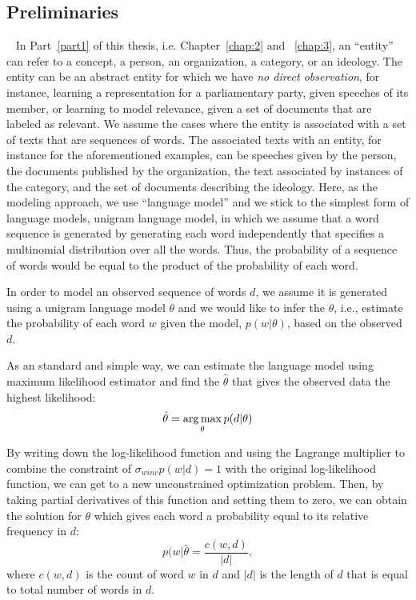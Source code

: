 \subsection{Preliminaries}
~\label{chap2_preliminaries}
In Part~\ref{part1} of this thesis, i.e. Chapter~\ref{chap:2} and ~\ref{chap:3}, an ``entity'' can refer to a concept, a person, an organization, a category, or an ideology. The entity can be an abstract entity for which we have \emph{no direct observation}, for instance, learning a representation for a parliamentary party, given speeches of its member, or learning to model relevance, given a set of documents that are labeled as relevant.
We assume the cases where the entity is associated with a set of texts that are sequences of words. The associated texts with an entity, for instance for the aforementioned examples, can be speeches given by the person, the documents published by the organization, the text associated by instances of the category, and the set of documents describing the ideology.
%
%
Here, as the modeling approach, we use ``language model'' and we stick to the simplest form of language models, unigram language model, in which we assume that a word sequence is generated by generating each word independently that specifies a multinomial distribution over all the words. Thus, the probability of a sequence of words would be equal to the product of the probability of each word.  

In order to model an observed sequence of words $d$, we assume it is generated using a unigram language model $\theta$ and we would like to infer the $\theta$, i.e., estimate the probability of each word $w$ given the model, $p(w|\theta)$, based on the observed $d$. 

As an standard and simple way, we can estimate the language model using maximum likelihood estimator and find the $\hat{\theta}$ that gives the observed data the highest likelihood:
\begin{equation}
\hat{\theta} = \operatorname*{arg\,max}_\theta p(d|\theta)
\end{equation}

By writing down the log-likelihood function and using the Lagrange multiplier to combine the constraint of $\sigma_{w in v}p(w|d) =1$ with the original log-likelihood function, we can get to a new unconstrained optimization problem. Then, by taking partial derivatives of this function and setting them to zero, we can obtain the solution for $\theta$ which gives each word a probability equal to its relative frequency in $d$:
\begin{equation}
    p(w|\hat{\theta} = \frac{c(w, d)}{|d|},
\end{equation}
where $c(w, d)$ is the count of word $w$ in $d$ and $|d|$ is the length of $d$ that is equal to total number of words in $d$.

